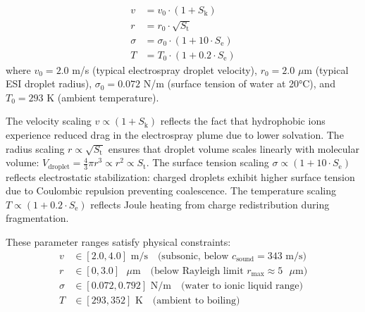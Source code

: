 \documentclass[11pt,twocolumn]{article}
\newcommand{\Sk}{S_{\text{k}}}
\newcommand{\St}{S_{\text{t}}}
\newcommand{\Se}{S_{\text{e}}}
\begin{document}
\begin{align}
    v &= v_0 \cdot (1 + \Sk) \label{eq:velocity} \\
    r &= r_0 \cdot \sqrt{\St} \label{eq:radius} \\
    \sigma &= \sigma_0 \cdot (1 + 10 \cdot \Se) \label{eq:surface_tension} \\
    T &= T_0 \cdot (1 + 0.2 \cdot \Se) \label{eq:temperature}
\end{align}
where $v_0 = 2.0$ m/s (typical electrospray droplet velocity), $r_0 = 2.0$ $\mu$m (typical ESI droplet radius), $\sigma_0 = 0.072$ N/m (surface tension of water at 20°C), and $T_0 = 293$ K (ambient temperature).

The velocity scaling $v \propto (1 + \Sk)$ reflects the fact that hydrophobic ions experience reduced drag in the electrospray plume due to lower solvation. The radius scaling $r \propto \sqrt{\St}$ ensures that droplet volume scales linearly with molecular volume: $V_{\text{droplet}} = \frac{4}{3}\pi r^3 \propto r^2 \propto \St$. The surface tension scaling $\sigma \propto (1 + 10 \cdot \Se)$ reflects electrostatic stabilization: charged droplets exhibit higher surface tension due to Coulombic repulsion preventing coalescence. The temperature scaling $T \propto (1 + 0.2 \cdot \Se)$ reflects Joule heating from charge redistribution during fragmentation.

These parameter ranges satisfy physical constraints:
\begin{align}
    v &\in [2.0, 4.0] \text{ m/s} \quad \text{(subsonic, below } c_{\text{sound}} = 343 \text{ m/s)} \\
    r &\in [0, 3.0] \text{ } \mu\text{m} \quad \text{(below Rayleigh limit } r_{\max} \approx 5 \text{ } \mu\text{m)} \\
    \sigma &\in [0.072, 0.792] \text{ N/m} \quad \text{(water to ionic liquid range)} \\
    T &\in [293, 352] \text{ K} \quad \text{(ambient to boiling)}
\end{align}
\end{document}
